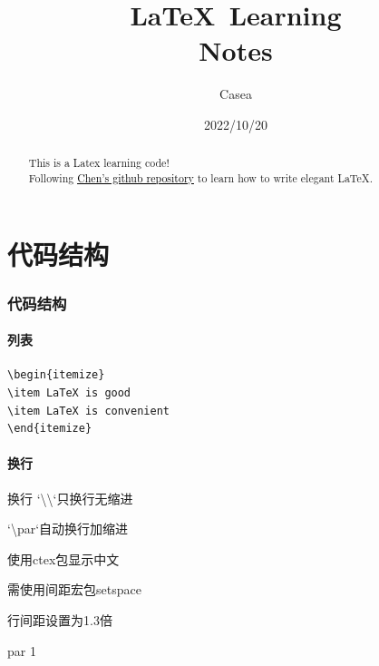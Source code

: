 \documentclass[a4paper,twoside,12pt]{article}
\title{\Huge\LaTeX  \, Learning \\ Notes  }
\author{Casea}
\date{2022/10/20}
\begin{document}
\maketitle
\newpage
\begin{abstract}
\vspace{1cm}
\noindent
{\large This is a Latex learning code!\\
Following \href{https://nbviewer.org/github/xinychen/latex-cookbook/blob/main/chapter-3/section7.ipynb}{\textcolor{black}{\uline{Chen's github repository}}} to learn how to write elegant \LaTeX.}
\end{abstract}
\newpage


\tableofcontents

\newpage



\part{代码结构}
\section{代码结构}
\subsection{列表}


\vspace{1em}
\begin{lstlisting}
\begin{itemize}
\item LaTeX is good
\item LaTeX is convenient
\end{itemize}
\end{lstlisting}


\subsection{换行}
\begin{spacing}{1.3} 
    换行 `\textbackslash\textbackslash`只换行无缩进 \par
    `\textbackslash par`自动换行加缩进 \par
    使用ctex包显示中文 \par
    需使用间距宏包setspace \par
    行间距设置为1.3倍    \par
    par 1  \par
\end{spacing}
\end{document}
